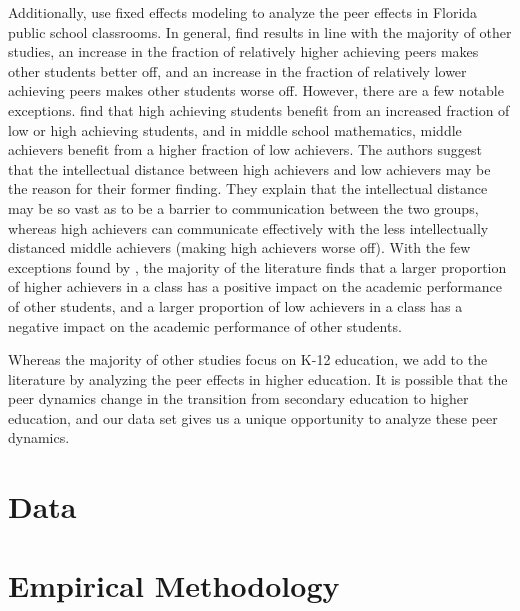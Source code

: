 \documentclass[12pt,letterpaper,english,fleqn]{article}
\newcommand{\sectlabel}[1]{section~\ref{#1} (\nameref{#1})}
\begin{document}
Additionally, \citet{burke2013classroom} use fixed effects modeling to analyze the peer effects in Florida public school classrooms.
In general, \citet{burke2013classroom} find results in line with the majority of other studies, an increase in the fraction of relatively higher achieving peers makes other students better off, and an increase in the fraction of relatively lower achieving peers makes other students worse off.
However, there are a few notable exceptions.
\citet{burke2013classroom} find that high achieving students benefit from an increased fraction of low or high achieving students, and in middle school mathematics, middle achievers benefit from a higher fraction of low achievers.
The authors suggest that the intellectual distance between high achievers and low achievers may be the reason for their former finding.
They explain that the intellectual distance may be so vast as to be a barrier to communication between the two groups, whereas high achievers can communicate effectively with the less intellectually distanced middle achievers (making high achievers worse off). 
With the few exceptions found by \citet{burke2013classroom}, the majority of the literature finds that a larger proportion of higher achievers in a class has a positive impact on the academic performance of other students, and a larger proportion of low achievers in a class has a negative impact on the academic performance of other students.%

Whereas the majority of other studies focus on K-12 education, we add to the literature by analyzing the peer effects in higher education. 
It is possible that the peer dynamics change in the transition from secondary education to higher education, and our data set gives us a unique opportunity to analyze these peer dynamics.

\section{Data}\label{data}



\section{Empirical Methodology}\label{methods}
\end{document}
